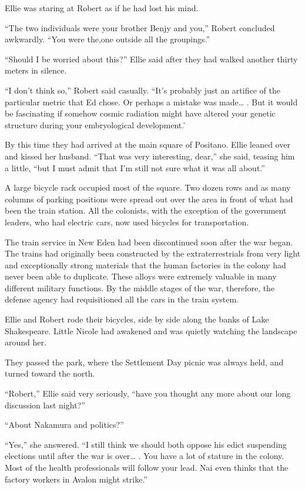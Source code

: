 \documentclass[]{article}
\begin{document}
{{Ellie was staring at Robert as if he had lost his mind.

“The two individuals were your brother Benjy and you,” Robert concluded awkwardly.  “You were the,one outside all the groupings.”

“Should I be worried about this?” Ellie said after they had walked another thirty meters in silence.

“I don’t think so,” Robert said casually.  “It’s probably just an artifice of the particular metric that Ed chose.  Or perhaps a mistake was made… .  But it would be fascinating if somehow cosmic radiation might have altered your genetic structure during your embryological development.’

By this time they had arrived at the main square of Positano.  Ellie leaned over and kissed her husband.  “That was very interesting, dear,” she said, teasing him a little, “but I must admit that I’m still not sure what it was all about.”

A large bicycle rack occupied most of the square.  Two dozen rows and as many columns of parking positions were spread out over the area in front of what had been the train station.  All the colonists, with the exception of the government leaders, who had electric cars, now used bicycles for transportation.

The train service in New Eden had been discontinued soon after the war began.  The trains had originally been constructed by the extraterrestrials from very light and exceptionally strong materials that the human factories in the colony had never been able to duplicate.  These alloys were extremely valuable in many different military functions.  By the middle stages of the war, therefore, the defense agency had requisitioned all the cars in the train system.

Ellie and Robert rode their bicycles, side by side along the banks of Lake Shakespeare.  Little Nicole had awakened and was quietly watching the landscape around her.

They passed the park, where the Settlement Day picnic was always held, and turned toward the north.

“Robert,” Ellie said very seriously, “have you thought any more about our long discussion last night?”

“About Nakamura and politics?”

“Yes,” she answered.  “I still think we should both oppose his edict suspending elections until after the war is over… .  You have a lot of stature in the colony.  Most of the health professionals will follow your lead.  Nai even thinks that the factory workers in Avalon might strike.”

}}
\end{document}

